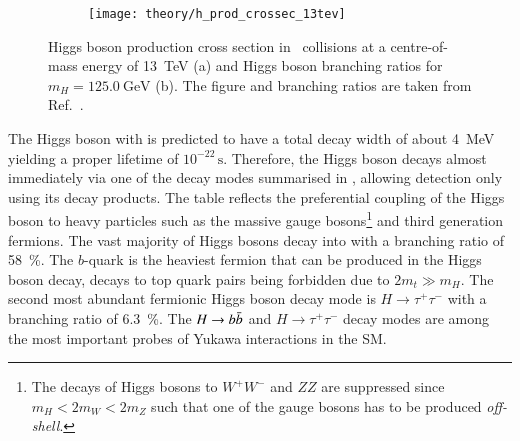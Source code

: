 \begin{figure}[htbp]
  \centering

  \begin{subfigure}[b]{0.47\textwidth}
    \centering

    \texttt{[image: theory/h\_prod\_crossec\_13tev]}

    \label{fig:higgs_prod_xsec}
  \end{subfigure}\hfill%
  \begin{subfigure}[b]{0.47\textwidth}
    \centering

    {
      \renewcommand{\arraystretch}{1.1}%
      
    }

    \vspace*{1.5em}

    \label{tab:higgs_branching_ratios}
  \end{subfigure}

  \caption[Higgs boson production cross section and branching ratios.]{Higgs
    boson production cross section in \pp~collisions at a centre-of-mass energy
    of \SI{13}{\TeV} (a) and Higgs boson branching ratios for
    $m_{H} = \SI{125.0}{\GeV}$ (b). The figure and branching ratios are taken
    from Ref.~\cite{deFlorian:2016spz}.}
\end{figure}

The Higgs boson with is predicted to have a total decay width of about
\SI{4}{\MeV}~\cite{deFlorian:2016spz} yielding a proper lifetime of
$10^{-22}\,\si{\second}$. Therefore, the Higgs boson decays almost immediately
via one of the decay modes summarised in ,
allowing detection only using its decay products. The table reflects the
preferential coupling of the Higgs boson to heavy particles such as the massive
gauge bosons\footnote{The decays of Higgs bosons to $W^+W^-$ and $ZZ$ are
  suppressed since $m_{H} < 2 m_{W} < 2 m_{Z}$ such that one of the gauge bosons
  has to be produced \emph{off-shell}.} and third generation fermions. The vast
majority of Higgs bosons decay into \bbbar with a branching ratio of
\SI{58}{\percent}. The $b$-quark is the heaviest fermion that can be produced in
the Higgs boson decay, decays to top quark pairs being forbidden due to
$2 m_t \gg m_H$. The second most abundant fermionic Higgs boson decay mode is
$H \to \tau^+ \tau^-$ with a branching ratio of \SI{6.3}{\percent}. The
$H \to b\bar{b}$ and $H \to \tau^+ \tau^-$ decay modes are among the most
important probes of Yukawa interactions in the SM.


